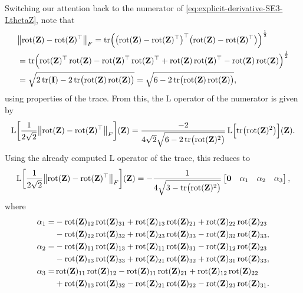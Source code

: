Switching our attention back to the numerator of \eqref{eq:explicit-derivative-SE3-LthetaZ}, note that
\begin{align}
    &\bigl\|\operatorname{rot}(\mathbf{Z}) - \operatorname{rot}(\mathbf{Z})^\top\bigr\|_F = 
    \operatorname{tr}\Bigl(\bigl(\operatorname{rot}(\mathbf{Z}) - \operatorname{rot}(\mathbf{Z})^\top\bigr)^\top\bigl(\operatorname{rot}(\mathbf{Z}) - \operatorname{rot}(\mathbf{Z})^\top\bigr)\Bigr)^{\frac{1}{2}}\\
    &= \operatorname{tr}\Bigl(\operatorname{rot}(\mathbf{Z})^\top\operatorname{rot}(\mathbf{Z})-\operatorname{rot}(\mathbf{Z})^\top\operatorname{rot}(\mathbf{Z})^\top + \operatorname{rot}(\mathbf{Z})\operatorname{rot}(\mathbf{Z})^\top - \operatorname{rot}(\mathbf{Z})\operatorname{rot}(\mathbf{Z})\Bigr)^{\frac{1}{2}}\\
    &= \sqrt{2\operatorname{tr}(\mathbf{I}) - 2\operatorname{tr}\bigl(\operatorname{rot}(\mathbf{Z})\operatorname{rot}(\mathbf{Z})\bigr)} = \sqrt{6 - 2\operatorname{tr}\bigl(\operatorname{rot}(\mathbf{Z})\operatorname{rot}(\mathbf{Z})\bigr)},
\end{align}
using properties of the trace. From this, the $\text{L}$ operator of the numerator is given by
\begin{align}
    \operatorname{L}\biggl[\frac{1}{2\sqrt{2}}\bigl\|\operatorname{rot}(\mathbf{Z}) - \operatorname{rot}(\mathbf{Z})^\top\bigr\|_F\biggr](\mathbf{Z}) = \frac{-2}{4\sqrt{2}\sqrt{6 - 2\operatorname{tr}\bigl(\operatorname{rot}(\mathbf{Z})^2\bigr)}}\operatorname{L}\Bigl[\operatorname{tr}\bigl(\operatorname{rot}(\mathbf{Z})^2\bigr)\Bigr](\mathbf{Z}).
\end{align}
Using the already computed $\text{L}$ operator of the trace, this reduces to
\begin{align}
    \operatorname{L}\biggl[\frac{1}{2\sqrt{2}}\bigl\|\operatorname{rot}(\mathbf{Z}) - \operatorname{rot}(\mathbf{Z})^\top\bigr\|_F\biggr](\mathbf{Z}) = -\frac{1}{4\sqrt{3 - \operatorname{tr}\bigl(\operatorname{rot}(\mathbf{Z})^2\bigr)}}\begin{bmatrix}
        \mathbf{0}& \alpha_1 & \alpha_2 & \alpha_3
    \end{bmatrix},
\end{align}
where 
\begin{align}
    \begin{split}
        \alpha_1 =& -\operatorname{rot}(\mathbf{Z})_{12}\operatorname{rot}(\mathbf{Z})_{31} + \operatorname{rot}(\mathbf{Z})_{13}\operatorname{rot}(\mathbf{Z})_{21} + \operatorname{rot}(\mathbf{Z})_{22}\operatorname{rot}(\mathbf{Z})_{23}  \\
        & - \operatorname{rot}(\mathbf{Z})_{22}\operatorname{rot}(\mathbf{Z})_{32} + \operatorname{rot}(\mathbf{Z})_{23}\operatorname{rot}(\mathbf{Z})_{33} - \operatorname{rot}(\mathbf{Z})_{32}\operatorname{rot}(\mathbf{Z})_{33},\\
        \alpha_2 =& -\operatorname{rot}(\mathbf{Z})_{11}\operatorname{rot}(\mathbf{Z})_{13} + \operatorname{rot}(\mathbf{Z})_{11}\operatorname{rot}(\mathbf{Z})_{31} - \operatorname{rot}(\mathbf{Z})_{12}\operatorname{rot}(\mathbf{Z})_{23} \\
        &- \operatorname{rot}(\mathbf{Z})_{13}\operatorname{rot}(\mathbf{Z})_{33} + \operatorname{rot}(\mathbf{Z})_{21}\operatorname{rot}(\mathbf{Z})_{32} + \operatorname{rot}(\mathbf{Z})_{31}\operatorname{rot}(\mathbf{Z})_{33},
        \\
        \alpha_3 =& \operatorname{rot}(\mathbf{Z})_{11}\operatorname{rot}(\mathbf{Z})_{12} - \operatorname{rot}(\mathbf{Z})_{11}\operatorname{rot}(\mathbf{Z})_{21} + \operatorname{rot}(\mathbf{Z})_{12}\operatorname{rot}(\mathbf{Z})_{22} \\
        &+ \operatorname{rot}(\mathbf{Z})_{13}\operatorname{rot}(\mathbf{Z})_{32} - \operatorname{rot}(\mathbf{Z})_{21}\operatorname{rot}(\mathbf{Z})_{22} - \operatorname{rot}(\mathbf{Z})_{23}\operatorname{rot}(\mathbf{Z})_{31}.
    \end{split}
\end{align}


